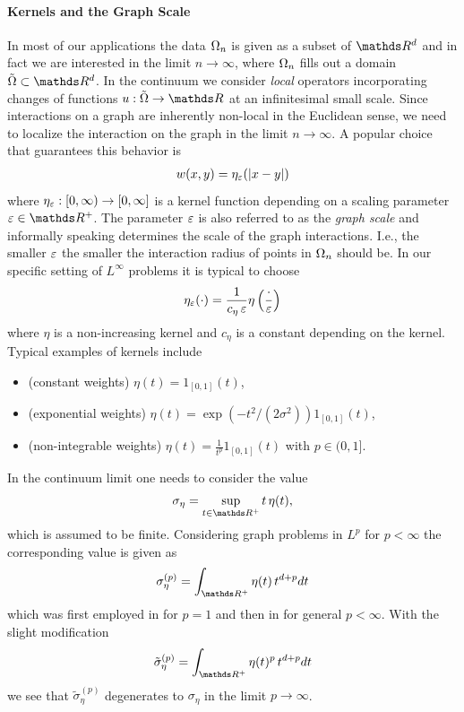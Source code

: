 \paragraph{Kernels and the Graph Scale} 
In most of our applications the data $\Omega_n$ is given as a subset of $\R^d$ and in fact we are interested in the limit $n\to\infty$, where $\Omega_n$ fills out a domain $\tilde\domain\subset\R^d$. In the continuum we consider \emph{local} operators incorporating changes of functions $u:\tilde\domain\to\R$ at an infinitesimal small scale. Since interactions on a graph are inherently non-local in the Euclidean sense, we need to localize the interaction on the graph in the limit $n\to\infty$. A popular choice that guarantees this behavior is
%
\begin{align*}
w(x,y) = \eta_{\varepsilon}(\left|x-y\right|)
\end{align*}
%
where $\eta_\varepsilon:[0,\infty)\to [0,\infty]$ is a kernel function depending on a scaling parameter $\gscale\in\R^+$. The parameter $\varepsilon$ is also referred to as the \emph{graph scale} and informally speaking determines the scale of the graph interactions. I.e., the smaller $\varepsilon$ the smaller the interaction radius of points in $\Omega_n$ should be. In our specific setting of $L^\infty$ problems it is typical to choose
%
\begin{align*}
\eta_\varepsilon(\cdot) = \frac{1}{c_\eta\, \varepsilon} \eta\left(\frac{\cdot}{\varepsilon}\right)
\end{align*}
%
where $\eta$ is a non-increasing kernel and $c_\eta$ is a constant depending on the kernel. Typical examples of kernels include
%
\begin{itemize}
\item (constant weights) $\eta(t)=1_{[0,1]}(t)$,
\item (exponential weights) $\eta(t)=\exp(-t^2/(2\sigma^2))1_{[0,1]}(t)$,
\item (non-integrable weights) $\eta(t)=\frac{1}{t^p}1_{[0,1]}(t)$ with $p\in(0,1]$.
\end{itemize}
%
%
\begin{remark}{}{}
In the continuum limit one needs to consider the value 
%
\begin{align*}
\sigma_\eta = \sup_{t\in\R^+} t\, \eta(t),
\end{align*}
%
which is assumed to be finite. Considering graph problems in $L^p$ for $p<\infty$
the corresponding value is given as
%
\begin{align}\label{eq:kernelconst}
\sigma_\eta^{(p)} = \int_{\R^+} \eta(t)\, t^{d+p} dt
\end{align}
%
which was first employed in \cite{GarcSlep15} for $p=1$ and then in \cite{slepcev2019analysis} for general $p<\infty$. With the slight modification
%
\begin{align*}
\tilde\sigma_\eta^{(p)} = 
\int_{\R^+} \eta(t)^p\, t^{d+p} dt
\end{align*}
%
we see that $\tilde\sigma_\eta^{(p)}$ degenerates to $\sigma_\eta$ in the limit $p\to\infty$.
\end{remark}
